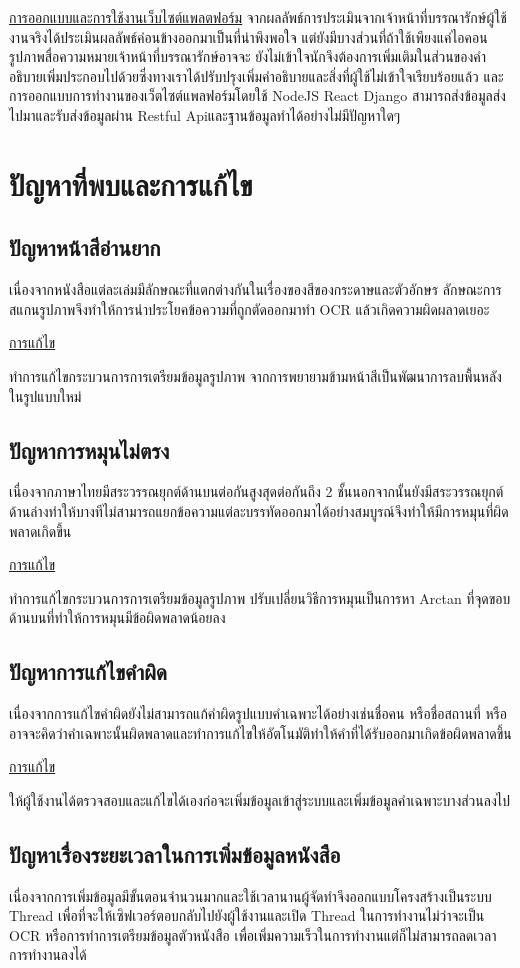 \underline{การออกแบบและการใช้งานเว็บไซต์แพลตฟอร์ม}
จากผลลัพธ์การประเมินจากเจ้าหน้าที่บรรณารักษ์ผู้ใช้งานจริงได้ประเมินผลลัพธ์ค่อนข้างออกมาเป็นที่น่าพึงพอใจ แต่ยังมีบางส่วนที่ถ้าใช้เพียงแค่ไอคอนรูปภาพสื่อความหมายเจ้าหน้าที่บรรณารักษ์อาจจะ
ยังไม่เข้าใจนักจึงต้องการเพิ่มเติมในส่วนของคำอธิบายเพิ่มประกอบไปด้วยซึ่งทางเราได้ปรับปรุงเพิ่มคำอธิบายและสิ่งที่ผู้ใช้ไม่เข้าใจเรียบร้อยแล้ว
และการออกแบบการทำงานของเว็ตไซต์แพลฟอร์มโดยใช้ NodeJS React Django สามารถส่งข้อมูลส่งไปมาและรับส่งข้อมูลผ่าน Restful Apiและฐานข้อมูลทำได้อย่างไม่มีปัญหาใดๆ




\section{ปัญหาที่พบและการแก้ไข}
\subsection{ปัญหาหน้าสีอ่านยาก}
เนื่องจากหนังสือแต่ละเล่มมีลักษณะที่แตกต่างกันในเรื่องของสีของกระดาษและตัวอักษร ลักษณะการสแกนรูปภาพจึงทำให้การนำประโยคข้อความที่ถูกตัดออกมาทำ OCR แล้วเกิดความผิดผลาดเยอะ

\underline{การแก้ไข}

	ทำการแก้ไขกระบวนการการเตรียมข้อมูลรูปภาพ จากการพยายามข้ามหน้าสีเป็นพัฒนาการลบพื้นหลังในรูปแบบใหม่
\subsection{ปัญหาการหมุนไม่ตรง}
เนื่องจากภาษาไทยมีสระวรรณยุกต์ด้านบนต่อกันสูงสุดต่อกันถึง 2 ชั้นนอกจากนั้นยังมีสระวรรณยุกต์ด้านล่างทำให้บางทีไม่สามารถแยกข้อความแต่ละบรรทัดออกมาได้อย่างสมบูรณ์จึงทำให้มีการหมุนที่ผิดพลาดเกิดขึ้น

\underline{การแก้ไข}

	ทำการแก้ไขกระบวนการการเตรียมข้อมูลรูปภาพ ปรับเปลี่ยนวิธีการหมุนเป็นการหา Arctan ที่จุดขอบด้านบนที่ทำให้การหมุนมีข้อผิดพลาดน้อยลง
\subsection{ปัญหาการแก้ไขคำผิด}
เนื่องจากการแก้ไขคำผิดยังไม่สามารถแก้คำผิดรูปแบบคำเฉพาะได้อย่างเช่นชื่อคน หรือชื่อสถานที่ หรืออาจจะคิดว่าคำเฉพาะนั้นผิดพลาดและทำการแก้ไขให้อัตโนมัติทำให้คำที่ได้รับออกมาเกิดข้อผิดพลาดขึ้น

\underline{การแก้ไข}

	ให้ผู้ใช้งานได้ตรวจสอบและแก้ไขได้เองก่อจะเพิ่มข้อมูลเข้าสู่ระบบและเพิ่มข้อมูลคำเฉพาะบางส่วนลงไป
\subsection{ปัญหาเรื่องระยะเวลาในการเพิ่มข้อมูลหนังสือ}
เนื่องจากการเพิ่มข้อมูลมีขั้นตอนจำนวนมากและใช้เวลานานผู้จัดทำจึงออกแบบโครงสร้างเป็นระบบ Thread เพื่อที่จะให้เซิฟเวอร์ตอบกลับไปยังผู้ใช้งานและเปิด Thread ในการทำงานไม่ว่าจะเป็น OCR หรือการทำการเตรียมข้อมูลตัวหนังสือ เพื่อเพิ่มความเร็วในการทำงานแต่ก็ไม่สามารถลดเวลาการทำงานลงได้


